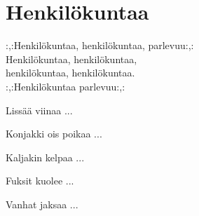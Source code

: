 \section{Henkilökuntaa}
:,:Henkilökuntaa, henkilökuntaa, parlevuu:,:\\
Henkilökuntaa, henkilökuntaa,\\
henkilökuntaa, henkilökuntaa.\\
:,:Henkilökuntaa parlevuu:,:

Lissää viinaa ...

Konjakki ois poikaa ...

Kaljakin kelpaa ...

Fuksit kuolee ...

Vanhat jaksaa ...
